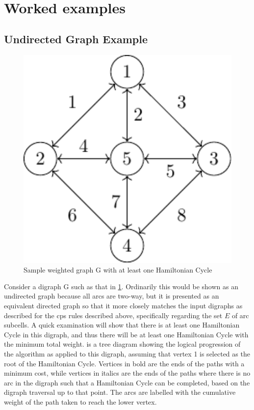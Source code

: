\section{\label{sec:tsp:example}Worked examples}

\subsection{Undirected Graph Example}

\begin{figure}
\centering
\includegraphics[keepaspectratio,width=1.0\textwidth,height=0.35\textheight]{chapters/tsp/figs/ugraph-figure0}
\caption{\label{fig:tsp:ugraph}Sample weighted graph G with at least one Hamiltonian Cycle}
\end{figure}

Consider a digraph G such as that in \cref{fig:tsp:ugraph}.  Ordinarily this would be shown as an undirected graph because all arcs are two-way, but it is presented as an equivalent directed graph so that it more closely matches the input digraphs as described for the \gls{cps} rules described above, specifically regarding the set \(E\) of arc subcells.  A quick examination will show that there is at least one Hamiltonian Cycle in this digraph, and thus there will be at least one Hamiltonian Cycle with the minimum total weight.   is a tree diagram showing the logical progression of the algorithm as applied to this digraph, assuming that vertex 1 is selected as the root of the Hamiltonian Cycle.  Vertices in bold are the ends of the paths with a minimum cost, while vertices in italics are the ends of the paths where there is no arc in the digraph such that a Hamiltonian Cycle can be completed, based on the digraph traversal up to that point.  The arcs are labelled with the cumulative weight of the path taken to reach the lower vertex.

